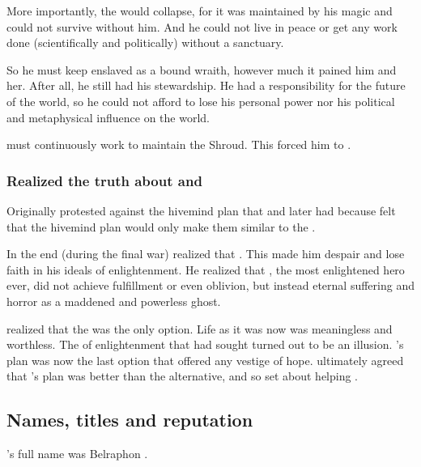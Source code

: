 More importantly, the  would collapse, for it was maintained by his magic and could not survive without him.
And he could not live in peace or get any work done (scientifically and politically) without a sanctuary.

So he must keep \Rystessakhin enslaved as a bound wraith, however much it pained him and her.
After all, he still had his stewardship.
He had a responsibility for the future of the world, so he could not afford to lose his personal power nor his political and metaphysical influence on the world.

\Ishnaruchaefir must continuously work to maintain the Shroud. 
This forced him to . 





\subsubsection{Realized the truth about \Sethicus and \Tiamat}
Originally \Iscrafel protested against the hivemind plan that \Tiamat and later \Secherdamon had because \Iscrafel felt that the hivemind plan would only make them similar to the \banes. 

In the end (during the final war) \Iscrafel realized that . 
This made him despair and lose faith in his ideals of enlightenment. 
He realized that \Sethicus, the most enlightened hero ever, did not achieve fulfillment or even oblivion, but instead eternal suffering and horror as a maddened and powerless ghost. 

\Iscrafel realized that the  was the only option.  
Life as it was now was meaningless and worthless. 
The  of enlightenment that \Sethicus had sought turned out to be an illusion. 
\Secherdamon's plan was now the last option that offered any vestige of hope. 
\Iscrafel ultimately agreed that \Secherdamon's plan was better than the alternative, and so set about helping \Secherdamon. 











\subsection{Names, titles and reputation}
\Ishnaruchaefir's full name was Belraphon \Quessanth \Melechet \Nierzshah \Tzeorossh \Ishnaruchaefir.

